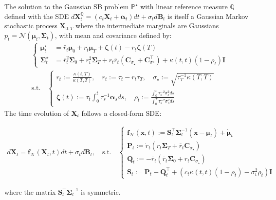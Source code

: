 \documentclass{article}
\begin{document}
\begin{theorem}\label{thm:closed-form-gaussiansbp}
    The solution to the Gaussian SB problem $\mathbb{P}^\star$ with linear reference measure $\mathbb{Q}$ defined with the SDE $d\boldsymbol{X}^{\mathbb{Q}}_t=(c_t\boldsymbol{X}_t+\boldsymbol{\alpha}_t)dt+\sigma_td\boldsymbol{B}_t$ is itself a Gaussian Markov stochastic process $\boldsymbol{X}_{0:T}$ where the intermediate marginals are Gaussians $p_t=\mathcal{N}(\boldsymbol{\mu}_t, \boldsymbol{\Sigma}_t)$, with mean and covariance defined by:
    \begin{align}
        &\begin{cases}
            \boldsymbol{\mu}^\star_t&=\bar{r}_t\boldsymbol{\mu}_0+r_t\boldsymbol{\mu}_T+\boldsymbol{\zeta}(t)-r_t\boldsymbol{\zeta}(T)\\
        \boldsymbol{\Sigma}^\star_t&=\bar{r}_t^2\boldsymbol{\Sigma}_0+r_t^2\boldsymbol{\Sigma}_T+r_t\bar{r}_t(\boldsymbol{C}_{\sigma_\star}+\boldsymbol{C}_{\sigma^\star}^\top)+\kappa(t,t)(1-\rho_t)\boldsymbol{I}
        \end{cases}\label{eq:gaussian-sb-meancov}\\
        &\text{s.t.}\quad\begin{cases}
            r_t:=\frac{\kappa(t,T)}{\kappa(T,T)}, \quad r_t:=\tau_t-r_t\tau_T, \quad \sigma_\star:=\sqrt{\tau_T^{-1}\kappa(T,T)}\\
            \boldsymbol{\zeta}(t):=\tau_t\int_0^t\tau_s^{-1}\boldsymbol{\alpha}_sds, \quad \rho_t:=\frac{\int_0^t\tau_s^{-2}\sigma_s^2ds}{\int_0^T\tau_s^{-2}\sigma_s^2ds}
        \end{cases}\nonumber
    \end{align}
    The time evolution of $\boldsymbol{X}_t$ follows a closed-form SDE:
    \begin{small}
    \begin{align}
        d\boldsymbol{X}_t=\boldsymbol{f}_{\mathcal{N}}(\boldsymbol{X}_t,t)dt+\sigma_td\boldsymbol{B}_t, \quad \text{s.t.}\quad \begin{cases}
            \boldsymbol{f}_{\mathcal{N}}(\boldsymbol{x},t):=\boldsymbol{S}_t^\top\boldsymbol{\Sigma}_t^{-1}(\boldsymbol{x}-\boldsymbol{\mu}_t)+\dot{\boldsymbol{\mu}}_t\\
            \boldsymbol{P}_t:=\dot{r}_t(r_t\boldsymbol{\Sigma}_T+\bar{r}_t\boldsymbol{C}_{\sigma_\star})\\
            \boldsymbol{Q}_t:=-\dot{\bar{r}}_t(\bar{r}_t\boldsymbol{\Sigma}_0+r_t\boldsymbol{C}_{\sigma_\star})\\
            \boldsymbol{S}_t:=\boldsymbol{P}_t-\boldsymbol{Q}_t^\top+(c_t\kappa(t,t)(1-\rho_t)-\sigma_t^2\rho_t)\boldsymbol{I}
        \end{cases}
    \end{align}
    \end{small}
    where the matrix $\boldsymbol{S}_t^\top \boldsymbol{\Sigma}_t^{-1}$ is symmetric.
\end{theorem}
\end{document}
